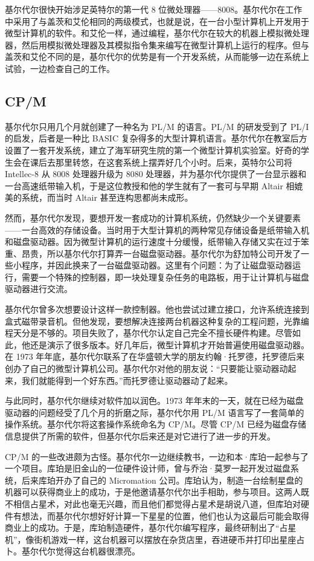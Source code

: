 \documentclass[12pt,UTF8]{ctexbook}
\begin{document}
基尔代尔很快开始涉足英特尔的第一代 8 位微处理器——8008。基尔代尔在工作中采用了与盖茨和艾伦相同的两级模式，也就是说，在一台小型计算机上开发用于微型计算机的软件。和艾伦一样，通过编程，基尔代尔在较大的机器上模拟微处理器，然后用模拟微处理器及其模拟指令集来编写在微型计算机上运行的程序。但与盖茨和艾伦不同的是，基尔代尔的优势是有一个开发系统，从而能够一边在系统上试验，一边检查自己的工作。





\subsection{CP/M}


基尔代尔只用几个月就创建了一种名为 PL/M 的语言。PL/M 的研发受到了 PL/I 的启发，后者是一种比 BASIC 复杂得多的大型计算机语言。基尔代尔在教室后方设置了一套开发系统，建立了海军研究生院的第一个微型计算机实验室。好奇的学生会在课后去那里转悠，在这套系统上摆弄好几个小时。后来，英特尔公司将 Intellec-8 从 8008 处理器升级为 8080 处理器，并为基尔代尔提供了一台显示器和一台高速纸带输入机，于是这位教授和他的学生就有了一套可与早期 Altair 相媲美的系统，而当时 Altair 甚至连构思都尚未成形。

然而，基尔代尔发现，要想开发一套成功的计算机系统，仍然缺少一个关键要素——一台高效的存储设备。当时用于大型计算机的两种常见存储设备是纸带输入机和磁盘驱动器。因为微型计算机的运行速度十分缓慢，纸带输入存储又实在过于笨重、昂贵，所以基尔代尔打算弄一台磁盘驱动器。基尔代尔为舒加特公司开发了一些小程序，并因此换来了一台磁盘驱动器。这里有个问题：为了让磁盘驱动器运行，需要一个特殊的控制器，即一块处理复杂任务的电路板，用于让计算机与磁盘驱动器进行交流。

基尔代尔曾多次想要设计这样一款控制器。他也尝试过建立接口，允许系统连接到盒式磁带录音机。但他发现，要想解决连接两台机器这种复杂的工程问题，光靠编程天分是不够的。项目失败了，基尔代尔认定自己完全不擅长硬件构建。尽管如此，他还是演示了很多版本。好几年后，微型计算机才开始普遍使用磁盘驱动器。在 1973 年年底，基尔代尔联系了在华盛顿大学的朋友约翰·托罗德，托罗德后来创办了自己的微型计算机公司。基尔代尔对他的朋友说：“只要能让驱动器动起来，我们就能得到一个好东西。”而托罗德让驱动器动了起来。

与此同时，基尔代尔继续对软件加以润色。1973 年年末的一天，就在已经为磁盘驱动器的问题经受了几个月的折磨之际，基尔代尔用 PL/M 语言写了一套简单的操作系统。基尔代尔将这套操作系统命名为 CP/M。尽管 CP/M 已经为磁盘存储信息提供了所需的软件，但基尔代尔后来还是对它进行了进一步的开发。

CP/M 的一些改进颇为古怪。基尔代尔一边继续教书，一边和本·库珀一起参与了一个项目。库珀是旧金山的一位硬件设计师，曾与乔治·莫罗一起开发过磁盘系统，后来库珀开办了自己的 Micromation 公司。库珀认为，制造一台绘制星盘的机器可以获得商业上的成功，于是他邀请基尔代尔出手相助，参与项目。这两人既不相信占星术，对此也毫无兴趣，而且他们都觉得占星术是胡说八道，但库珀对硬件有想法，而基尔代尔想好好计算一下星星的位置，他们也认为这最后可能会取得商业上的成功。于是，库珀制造硬件，基尔代尔编写程序，最终研制出了“占星机”，像街机游戏一样，这台机器可以摆放在杂货店里，吞进硬币并打印出星座占卜。基尔代尔觉得这台机器很漂亮。
\end{document}
